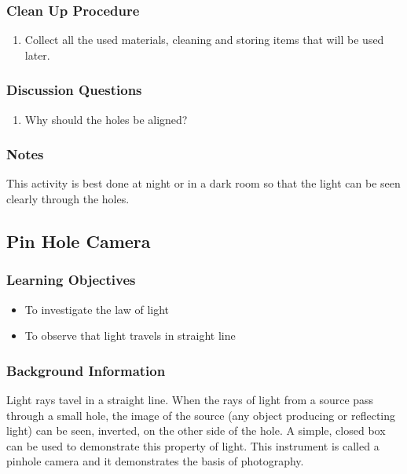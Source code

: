 \subsubsection*{Clean Up Procedure}
\begin{enumerate}
\item{Collect all the used materials, cleaning and storing items that will be used later.} 
\end{enumerate}

\subsubsection*{Discussion Questions}
\begin{enumerate}
\item{Why should the holes be aligned?}
\end{enumerate}

\subsubsection*{Notes}
This activity is best done at night or in a dark room so that the light can be seen clearly through the holes.


\subsection{Pin Hole Camera}

\subsubsection*{Learning Objectives}
\begin{itemize}
\item{To investigate the law of light} 
\item{To observe that light travels in straight line} 
\end{itemize}

\subsubsection*{Background Information}
Light rays tavel in a straight line.  When the rays of light from a source pass through a small hole, the image of the source (any object producing or reflecting light) can be seen, inverted, on the other side of the hole.  A simple, closed box can be used to demonstrate this property of light.  This instrument is called a pinhole camera and it demonstrates the basis of photography.

